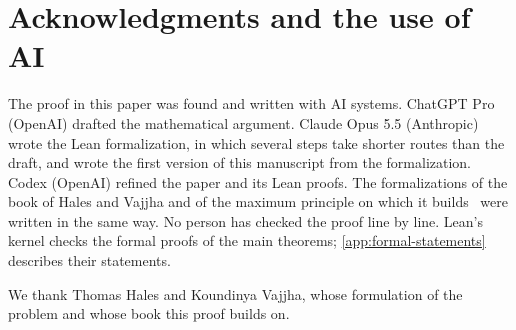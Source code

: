 \section*{Acknowledgments and the use of AI}

The proof in this paper was found and written with AI systems. ChatGPT Pro (OpenAI) drafted the
mathematical argument. Claude Opus 5.5 (Anthropic) wrote the Lean formalization, in which several
steps take shorter routes than the draft, and wrote the first version of this manuscript from the
formalization.
Codex (OpenAI) refined the paper and its Lean proofs.
The formalizations of the book
of Hales and Vajjha and of the maximum principle on which it
builds~\cite{SmoothedPolygonLean,OptimalControlLean,FixedPointLean} were written in the same way.
No person has checked the proof line by line. Lean's kernel checks the formal proofs of the main
theorems; \cref{app:formal-statements} describes their statements.

We thank Thomas Hales and Koundinya Vajjha, whose formulation of the problem and whose book this
proof builds on.
